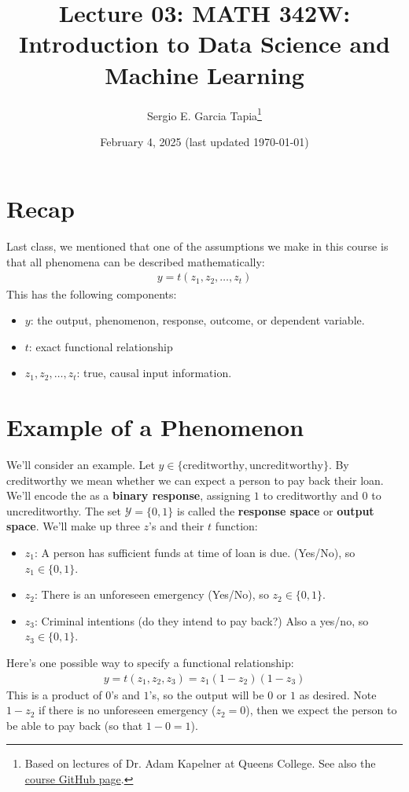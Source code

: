 \documentclass[12pt, a4paper]{article}
\title{Lecture 03: MATH 342W: Introduction to Data Science and Machine Learning}
\author{Sergio E. Garcia Tapia\thanks{Based on lectures of Dr. Adam Kapelner at Queens College.
		See also the \href{https://github.com/kapelner/QC_MATH_342W_Spring_2025}{course GitHub page}.}}
\date{February 4, 2025 (last updated \today)}
\begin{document}
 
	\maketitle
	\section*{Recap}
	Last class, we mentioned that one of the assumptions we make in this course is
	that all phenomena can be described mathematically:
	\begin{align*}
		y = t(z_1,z_2,\ldots,z_t)
	\end{align*}
	This has the following components:
	\begin{itemize}
		\item $y$: the output, phenomenon, response, outcome, or dependent variable.
		\item $t$: exact functional relationship
		\item $z_1,z_2,\ldots,z_t$: true, causal input information.
	\end{itemize}
	\section*{Example of a Phenomenon}
	We'll consider an example. Let $y\in \{\text{creditworthy}, \text{uncreditworthy}\}$.
	By creditworthy we mean whether we can expect a person to pay back their loan.
	We'll encode the as a \textbf{binary response}, assigning $1$ to creditworthy and
	$0$ to uncreditworthy. The set $\mathcal{Y}=\{0, 1\}$ is called the \textbf{response space}
	or \textbf{output space}. We'll make up three $z$'s  and their $t$ function:
	\begin{itemize}
		\item $z_1$: A person has sufficient funds at time of loan is due. (Yes/No), so
		$z_1\in\{0, 1\}$.
		\item $z_2$: There is an unforeseen emergency (Yes/No), so $z_2\in\{0, 1\}$.
		\item $z_3$: Criminal intentions (do they intend to pay back?) Also a yes/no, so
		$z_3\in\{0, 1\}$.
	\end{itemize}
	Here's one possible way to specify a functional relationship:
	\begin{align*}
		y = t(z_1,z_2,z_3) = z_1(1-z_2)(1-z_3)
	\end{align*}
	This is a product of $0$'s and $1$'s, so the output will be $0$ or $1$ as desired.
	Note $1-z_2$ if there is no unforeseen emergency ($z_2 = 0$), then we expect the
	person to be able to pay back (so that $1-0=1$).
	
\end{document}
